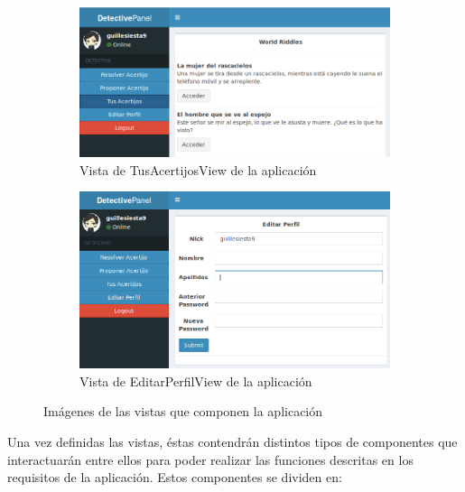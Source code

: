 \begin{figure}[htbp]\ContinuedFloat
\centering
\begin{subfigure}{.8\textwidth}
    \includegraphics[width=\linewidth]{figuras/tusacertijosview.png}
    \caption{Vista de TusAcertijosView de la aplicación}
    \label{fig::tusacertijosview}
\end{subfigure}
\begin{subfigure}{.8\textwidth}
    \includegraphics[width=\linewidth]{figuras/editarperfilview.png}
    \caption{Vista de EditarPerfilView de la aplicación} 
    \label{fig::editarperfilview}
\end{subfigure}
\caption{Imágenes de las vistas que componen la aplicación}
\label{fig::vistas}
\end{figure}
Una vez definidas las vistas, éstas contendrán distintos tipos de componentes que interactuarán entre ellos para poder realizar las funciones descritas en los requisitos de la aplicación. Estos componentes se dividen en:

